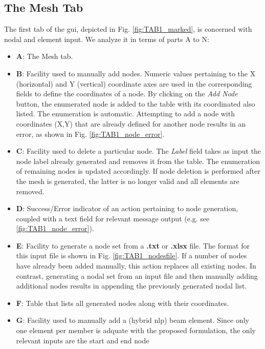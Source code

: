 \begin{appendices}
\section*{The Mesh Tab}

The first tab of the \acrshort{gui}, depicted in Fig. \ref{fig:TAB1_marked}, is 
concerned 
with nodal and element input. We analyze it in terms of parts A to N:

\begin{itemize}
	\item \textbf{A}: The Mesh tab.
	\item \textbf{B}: Facility used to manually add nodes. Numeric values 
	pertaining to the X (horizontal) and Y (vertical) coordinate axes are used 
	in the corresponding fields to define the coordinates of a node. By 
	clicking on the \textit{Add Node} button, the enumerated node is added to 
	the table with its coordinated also listed. The enumeration is automatic. 
	Attempting to add a node with coordinates (X,Y) that are already defined 
	for another node results in an error, as shown in Fig. 
	\ref{fig:TAB1_node_error}.
	\item \textbf{C}: Facility used to delete a particular node. The 
	\textit{Label} field takes as input the node label already generated and 
	removes it from the table. The enumeration of remaining nodes is updated 
	accordingly. If node deletion is performed after the mesh is generated, the 
	latter is no longer valid and all elements are removed.
	\item \textbf{D}: Success/Error indicator of an action pertaining to node 
	generation, coupled with a text field for relevant message output (e.g. see 
	\ref{fig:TAB1_node_error}).
	\item \textbf{E}: Facility to generate a node set from a \textbf{.txt} or 
	\textbf{.xlsx} file. The format for this input file is shown in Fig. 
	\ref{fig:TAB1_nodesfile}. If a number of nodes have already been added 
	manually, this action replaces all existing nodes. In contrast, generating 
	a nodal set from an input file and then manually adding additional nodes 
	results in appending the previously generated nodal list.
	\item \textbf{F}: Table that lists all generated nodes along with their 
	coordinates.
	\item \textbf{G}: Facility used to manually add a (hybrid \acrshort{nlp}) 
	beam element. Since only one element per member is adquate with the 
	proposed formulation, the only relevant inputs are the start and end node 

\end{itemize}
\end{appendices}

